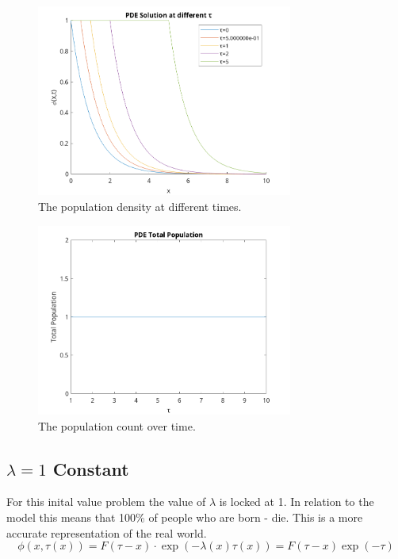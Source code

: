 \documentclass[paper=a4, fontsize=11pt]{scrartcl} %
\numberwithin{equation}{section} %
\numberwithin{figure}{section} %
\numberwithin{table}{section} %
\begin{document}
\begin{figure}[H]\label{prob1:3d}
	\centering
	\includegraphics[width=0.75\textwidth]{prob1}
	\caption{The population density at different times.}
\end{figure}
\begin{figure}[H]\label{prob1:3d}
	\centering
	\includegraphics[width=0.75\textwidth]{prob1-pop}
	\caption{The population count over time.}
\end{figure}

\subsection{$\lambda=1$ Constant}
For this inital value problem the value of $\lambda$ is locked at 1. In relation to the model this means that 100\% of people who are born - die. This is a more accurate representation of the real world.
\begin{equation}\label{eq:constant}
	\phi(x, \tau(x)) = F(\tau-x)\cdot\exp(-\lambda(x)\tau(x)) = F(\tau-x)\exp(-\tau)
\end{equation}
\end{document}
